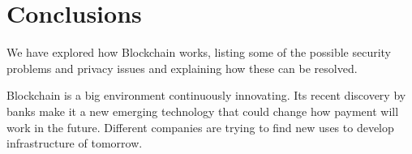 \section*{Conclusions}

We have explored how Blockchain works, listing some of the possible security
problems and privacy issues and explaining how these can be resolved.

Blockchain is a big environment continuously innovating. Its recent discovery by
banks make it a new emerging technology that could change how payment will work
in the future. Different companies are trying to find new uses to develop
infrastructure of tomorrow.
